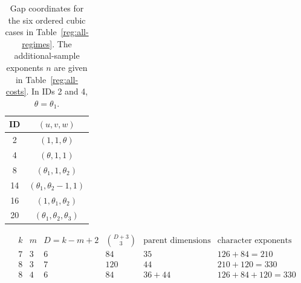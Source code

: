 \documentclass[11pt]{amsart}
\theoremstyle{definition}
\theoremstyle{remark}
\numberwithin{equation}{section}
\begin{document}
\begin{table}[H]
\centering\small
\caption{Gap coordinates for the six ordered cubic cases in Table~\ref{reg:all-regimes}. The additional-sample exponents $n$ are given in Table~\ref{reg:all-costs}. In IDs 2 and 4, $\theta=\theta_1$.}\label{app:table-ordered-cubic}
\begin{tabular}{cc}
\toprule
ID & $(u,v,w)$\\\midrule
2 & $(1,1,\theta)$\\
4 & $(\theta,1,1)$\\
8 & $(\theta_1,1,\theta_2)$\\
14 & $(\theta_1,\theta_2-1,1)$\\
16 & $(1,\theta_1,\theta_2)$\\
20 & $(\theta_1,\theta_2,\theta_3)$\\\bottomrule
\end{tabular}
\end{table}

\begin{table}[H]
\centering\small
\caption{Derivative-phase and parent-block dimensions and character exponents for the applications of Proposition~\ref{low:78:smult:atlas}. The derivative phase includes its constant and supplies the first character exponent; the remaining exponents come from the complete binary parent jets.}\label{app:table-parent-blocks}
\[
\begin{array}{c|c|c|c|c|c}
k&m&D=k-m+2&\binom{D+3}{3}&\text{parent dimensions}&\text{character exponents}\\\hline
7&3&6&84&35&126+84=210\\
8&3&7&120&44&210+120=330\\
8&4&6&84&36+44&126+84+120=330
\end{array}
\]
\end{table}
\end{document}
